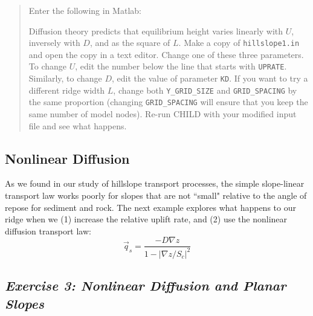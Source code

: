 \documentclass[12pt,reqno]{amsart}
\begin{document}
\begin{quote}
{%
Enter the following in Matlab:
Diffusion theory predicts that equilibrium height varies linearly with $U$, inversely with $D$, and as the square of $L$. Make a copy of {\tt hillslope1.in} and open the copy in a text editor. Change one of these three parameters. To change $U$, edit the number below the line that starts with {\tt UPRATE}. Similarly, to change $D$, edit the value of parameter {\tt KD}. If you want to try a different ridge width $L$, change both {\tt Y\_GRID\_SIZE} and {\tt GRID\_SPACING} by the same proportion (changing {\tt GRID\_SPACING} will ensure that you keep the same number of model nodes). Re-run CHILD with your modified input file and see what happens.
}
\end{quote}

\subsection{Nonlinear Diffusion}

As we found in our study of hillslope transport processes, the simple slope-linear transport law works poorly for slopes that are not ``small" relative to the angle of repose for sediment and rock. The next example explores what happens to our ridge when we (1) increase the relative uplift rate, and (2) use the nonlinear diffusion transport law:
\begin{equation}
\vec{q}_s = \frac{-D \nabla z}{1-|\nabla z/S_c|^2}
\end{equation}

\subsection*{\em Exercise 3: Nonlinear Diffusion and Planar Slopes}
\end{document}
